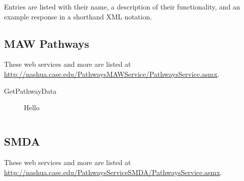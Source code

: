 Entries are listed with their name, a description of their functionality, and
an example response in a shorthand XML notation.

\subsection{MAW Pathways}

These web services and more are listed at \\
\href{http://nashua.case.edu/PathwaysMAWService/PathwaysService.asmx}{http://nashua.case.edu/PathwaysMAWService/PathwaysService.asmx}.

\begin{description}

    \item[GetPathwayData] Hello

    \begin{lstlisting}
    \end{lstlisting}

\end{description}

\subsection{SMDA}

These web services and more are listed at \\
\href{http://nashua.case.edu/PathwaysServiceSMDA/PathwaysService.asmx}{http://nashua.case.edu/PathwaysServiceSMDA/PathwaysService.asmx}.

